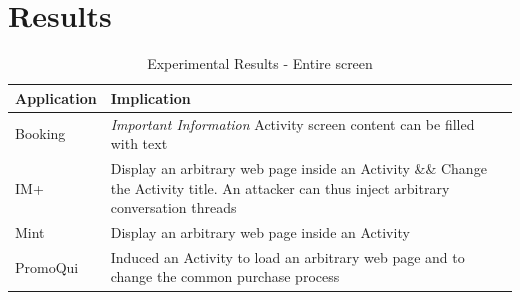 \section{Results}
\label{sec:results}



\begin{table}[t]
\small
\centering
\renewcommand{\arraystretch}{1.3}

\parbox{.45\linewidth}{
  \centering
  \caption{Experimental Results - Entire screen}
  \label{table:1}
  \begin{tabular}{|l|p{5cm}|}%
    \hline
    Application & Implication \\ \hline
    Booking & \emph{Important Information} Activity screen content can be filled with text\\
    IM+ & Display an arbitrary web page inside an Activity \&\& Change the Activity title. An attacker can thus inject arbitrary conversation threads \\
    Mint & Display an arbitrary web page inside an Activity \\
    PromoQui & Induced an Activity to load an arbitrary web page and to change the common purchase process \\

\end{tabular}}
\end{table}
